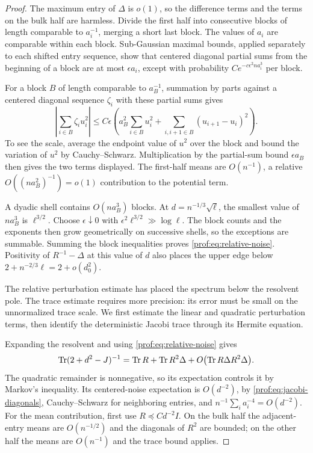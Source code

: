 \begin{proof}
The maximum entry of $\Delta$ is $o(1)$, so the
difference terms and the terms on the bulk half are harmless.  Divide
the first half into consecutive blocks of length comparable to $a_i^{-1}$,
merging a short last block.  The values of $a_i$ are comparable within
each block.  Sub-Gaussian maximal bounds, applied separately to each
shifted entry sequence, show that centered diagonal partial sums from
the beginning of a block are at most $\epsilon a_i$, except with
probability $Ce^{-c\epsilon^2na_i^3}$ per block.

For a block $B$ of length comparable to $a_B^{-1}$, summation by parts
against a centered diagonal sequence $\zeta_i$ with these partial sums
gives
\[
 \left|\sum_{i\in B}\zeta_i u_i^2\right|
 \le C\epsilon\left(
 a_B^2\sum_{i\in B}u_i^2+
 \sum_{i,i+1\in B}(u_{i+1}-u_i)^2\right).
\]
To see the scale, average the endpoint value of $u^2$ over the block
and bound the variation of $u^2$ by Cauchy--Schwarz. Multiplication by
the partial-sum bound $\epsilon a_B$ then gives the two terms displayed.
The first-half means are $O(n^{-1})$, a relative
$O((na_B^2)^{-1})=o(1)$ contribution to the potential term.

A dyadic shell contains $O(na_B^3)$ blocks. At
$d=n^{-1/3}\sqrt\ell$, the smallest value of $na_B^3$ is
$\ell^{3/2}$. Choose $\epsilon\downarrow0$ with
$\epsilon^2\ell^{3/2}\gg\log\ell$. The block counts and the exponents
then grow geometrically on successive shells, so the exceptions are
summable. Summing the block inequalities proves
\eqref{prof:eq:relative-noise}. Positivity of $R^{-1}-\Delta$ at this
value of $d$ also places the upper edge below
$2+n^{-2/3}\ell=2+o(d_0^2)$.

The relative perturbation estimate has placed the spectrum below the
resolvent pole. The trace estimate requires more precision: its error
must be small on the unnormalized trace scale. We first estimate the
linear and quadratic perturbation terms, then identify the deterministic
Jacobi trace through its Hermite equation.

Expanding the resolvent and using \eqref{prof:eq:relative-noise} gives
\[
 \operatorname{Tr}(2+d^2-J)^{-1}
 =\operatorname{Tr} R+\operatorname{Tr} R^2\Delta
   +O\bigl(\operatorname{Tr} R\Delta R^2\Delta\bigr).
\]
The quadratic remainder is nonnegative, so its expectation controls it
by Markov's inequality. Its centered-noise expectation
is $O(d^{-2})$, by \eqref{prof:eq:jacobi-diagonals}, Cauchy--Schwarz
for neighboring entries, and
$n^{-1}\sum_i a_i^{-4}=O(d^{-2})$.  For the mean contribution, first
use $R\preceq Cd^{-2}I$.  On the bulk half the adjacent-entry means
are $O(n^{-1/2})$ and the diagonals of $R^2$ are bounded; on the other
half the means are $O(n^{-1})$ and the trace bound applies.


\end{proof}
